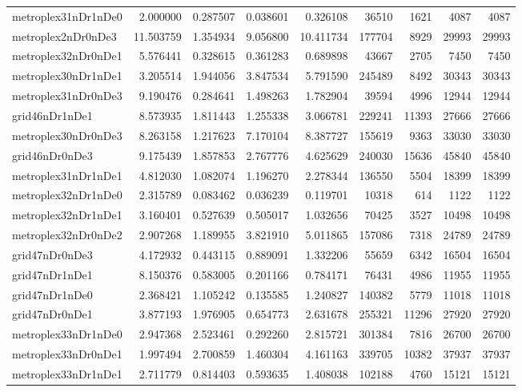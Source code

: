 \documentclass[../../../thesis.tex]{subfiles}
\begin{document}
\begin{longtable}{|l|r|r|r|r|r|r|r|r|}
metroplex31nDr1nDe0 & 2.000000 & 0.287507 & 0.038601 & 0.326108 & 36510 & 1621 & 4087 & 4087 \\
metroplex2nDr0nDe3 & 11.503759 & 1.354934 & 9.056800 & 10.411734 & 177704 & 8929 & 29993 & 29993 \\
metroplex32nDr0nDe1 & 5.576441 & 0.328615 & 0.361283 & 0.689898 & 43667 & 2705 & 7450 & 7450 \\
metroplex30nDr1nDe1 & 3.205514 & 1.944056 & 3.847534 & 5.791590 & 245489 & 8492 & 30343 & 30343 \\
metroplex31nDr0nDe3 & 9.190476 & 0.284641 & 1.498263 & 1.782904 & 39594 & 4996 & 12944 & 12944 \\
grid46nDr1nDe1 & 8.573935 & 1.811443 & 1.255338 & 3.066781 & 229241 & 11393 & 27666 & 27666 \\
metroplex30nDr0nDe3 & 8.263158 & 1.217623 & 7.170104 & 8.387727 & 155619 & 9363 & 33030 & 33030 \\
grid46nDr0nDe3 & 9.175439 & 1.857853 & 2.767776 & 4.625629 & 240030 & 15636 & 45840 & 45840 \\
metroplex31nDr1nDe1 & 4.812030 & 1.082074 & 1.196270 & 2.278344 & 136550 & 5504 & 18399 & 18399 \\
metroplex32nDr1nDe0 & 2.315789 & 0.083462 & 0.036239 & 0.119701 & 10318 & 614 & 1122 & 1122 \\
metroplex32nDr1nDe1 & 3.160401 & 0.527639 & 0.505017 & 1.032656 & 70425 & 3527 & 10498 & 10498 \\
metroplex32nDr0nDe2 & 2.907268 & 1.189955 & 3.821910 & 5.011865 & 157086 & 7318 & 24789 & 24789 \\
grid47nDr0nDe3 & 4.172932 & 0.443115 & 0.889091 & 1.332206 & 55659 & 6342 & 16504 & 16504 \\
grid47nDr1nDe1 & 8.150376 & 0.583005 & 0.201166 & 0.784171 & 76431 & 4986 & 11955 & 11955 \\
grid47nDr1nDe0 & 2.368421 & 1.105242 & 0.135585 & 1.240827 & 140382 & 5779 & 11018 & 11018 \\
grid47nDr0nDe1 & 3.877193 & 1.976905 & 0.654773 & 2.631678 & 255321 & 11296 & 27920 & 27920 \\
metroplex33nDr1nDe0 & 2.947368 & 2.523461 & 0.292260 & 2.815721 & 301384 & 7816 & 26700 & 26700 \\
metroplex33nDr0nDe1 & 1.997494 & 2.700859 & 1.460304 & 4.161163 & 339705 & 10382 & 37937 & 37937 \\
metroplex33nDr1nDe1 & 2.711779 & 0.814403 & 0.593635 & 1.408038 & 102188 & 4760 & 15121 & 15121 \\

\end{longtable}
\end{document}
